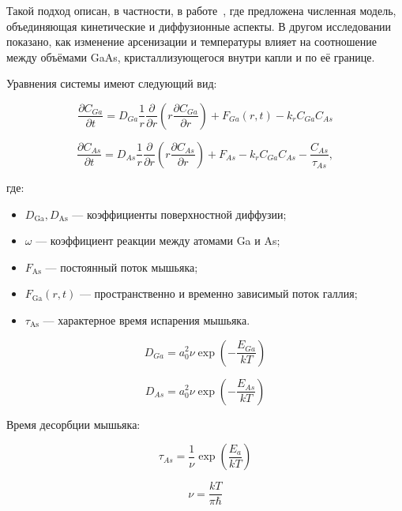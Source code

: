 \documentclass[14pt,oneside]{extarticle}
\begin{document}
Такой подход описан, в частности, в работе~\cite{reyes2013_1}, где предложена численная модель, объединяющая кинетические и диффузионные аспекты. В другом исследовании~\cite{bietti2020} показано, как изменение арсенизации и температуры влияет на соотношение между объёмами GaAs, кристаллизующегося внутри капли и по её границе.

Уравнения системы имеют следующий вид:

\begin{equation}
\frac{\partial C_{Ga}}{\partial t}=D_{Ga}\frac{1}{r}\frac{\partial}{\partial r}\left(r\frac{\partial C_{Ga}}{\partial r}\right)+F_{Ga}\left(r,t\right)-k_{r}C_{Ga}C_{As}
\label{eq:ga_diff}
\end{equation}

\begin{equation}
\frac{\partial C_{As}}{\partial t}=D_{As}\frac{1}{r}\frac{\partial}{\partial r}\left(r\frac{\partial C_{As}}{\partial r}\right)+F_{As}-k_{r}C_{Ga}C_{As}-\frac{C_{As}}{\tau_{As}},
\label{eq:as_diff}
\end{equation}

где:
\begin{itemize}
  \item $D_{\text{Ga}}, D_{\text{As}}$ — коэффициенты поверхностной диффузии;
  \item $\omega$ — коэффициент реакции между атомами Ga и As;
  \item $F_{\text{As}}$ — постоянный поток мышьяка;
  \item $F_{\text{Ga}}(r,t)$ — пространственно и временно зависимый поток галлия;
  \item $\tau_{\text{As}}$ — характерное время испарения мышьяка.
\end{itemize}

\begin{equation}
D_{Ga}=a_{0}^{2}\nu\exp\left(-\frac{E_{Ga}}{kT}\right)
\end{equation}

\begin{equation}
D_{As}=a_{0}^{2}\nu\exp\left(-\frac{E_{As}}{kT}\right)
\end{equation}

Время десорбции мышьяка:

\begin{equation}
\tau_{As}=\frac{1}{\nu}\exp\left(\frac{E_{a}}{kT}\right)
\end{equation}

\begin{equation}
\nu=\frac{kT}{\pi\hbar}
\end{equation}
\end{document}
